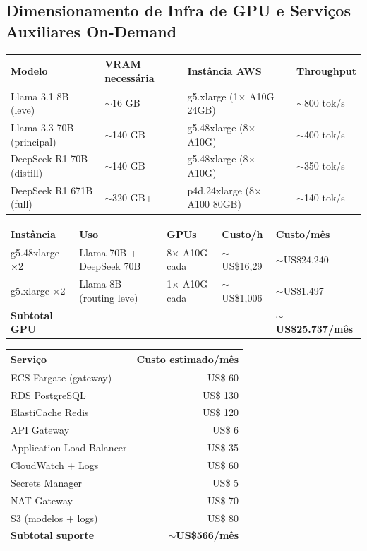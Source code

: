\documentclass[12pt,a4paper,]{abntex2}
\begin{document}
\newpage
\subsection{Dimensionamento de Infra de GPU e Serviços Auxiliares On-Demand}

\begin{table}[h]
\centering
\begin{tabular}{|l|l|l|l|}
\hline
\textbf{Modelo} & \textbf{VRAM necessária} & \textbf{Instância AWS} & \textbf{Throughput} \\
\hline
Llama 3.1 8B (leve) & $\sim$16 GB & g5.xlarge (1× A10G 24GB) & $\sim$800 tok/s \\
Llama 3.3 70B (principal) & $\sim$140 GB & g5.48xlarge (8× A10G) & $\sim$400 tok/s \\
DeepSeek R1 70B (distill) & $\sim$140 GB & g5.48xlarge (8× A10G) & $\sim$350 tok/s \\
DeepSeek R1 671B (full) & $\sim$320 GB+ & p4d.24xlarge (8× A100 80GB) & $\sim$140 tok/s \\
\hline
\end{tabular}
\end{table}

\begin{table}[h]
\centering
\begin{tabular}{|l|l|l|l|l|}
\hline
\textbf{Instância} & \textbf{Uso} & \textbf{GPUs} & \textbf{Custo/h} & \textbf{Custo/mês} \\
\hline
g5.48xlarge ×2 & Llama 70B + DeepSeek 70B & 8× A10G cada & $\sim$US\$16,29 & $\sim$US\$24.240 \\
g5.xlarge ×2 & Llama 8B (routing leve) & 1× A10G cada & $\sim$US\$1,006 & $\sim$US\$1.497 \\
\hline
\textbf{Subtotal GPU} & & & & \textbf{$\sim$US\$25.737/mês} \\
\hline
\end{tabular}
\end{table}

\begin{table}[h]
\centering
\begin{tabular}{|l|r|}
\hline
\textbf{Serviço} & \textbf{Custo estimado/mês} \\
\hline
ECS Fargate (gateway) & US\$ 60 \\
RDS PostgreSQL & US\$ 130 \\
ElastiCache Redis & US\$ 120 \\
API Gateway & US\$ 6 \\
Application Load Balancer & US\$ 35 \\
CloudWatch + Logs & US\$ 60 \\
Secrets Manager & US\$ 5 \\
NAT Gateway & US\$ 70 \\
S3 (modelos + logs) & US\$ 80 \\
\hline
\textbf{Subtotal suporte} & \textbf{$\sim$US\$566/mês} \\
\hline
\end{tabular}
\end{table}
\end{document}
